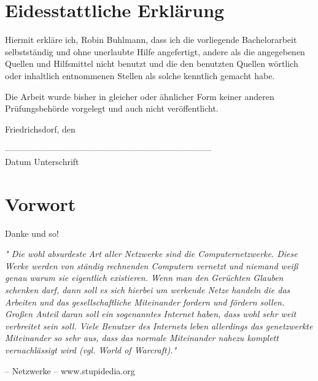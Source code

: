 \newpage
\chapter*{Eidesstattliche Erklärung}

Hiermit erkläre ich, Robin Buhlmann, dass ich die vorliegende Bachelorarbeit selbstständig und ohne unerlaubte Hilfe angefertigt, andere als die angegebenen Quellen und Hilfsmittel nicht benutzt und die den benutzten Quellen wörtlich oder inhaltlich entnommenen Stellen als solche kenntlich gemacht habe.

Die Arbeit wurde bisher in gleicher oder ähnlicher Form keiner anderen Prüfungsbehörde vorgelegt und auch nicht veröffentlicht.


\vspace{1cm}

Friedrichsdorf, den

\vspace{1cm}

------------------------------------\hspace{6cm}------------------------------------\\
Datum \hspace{9,4cm} Unterschrift

\newpage

\chapter*{Vorwort}
\setlength{\parindent}{0em}
\setlength{\parskip}{1em}

Danke und so!\par

\begin{displayquote} 
\textit{"
Die wohl absurdeste Art aller Netzwerke sind die Computernetzwerke. Diese Werke werden von ständig rechnenden Computern vernetzt und niemand weiß genau warum sie eigentlich existieren. Wenn man den Gerüchten Glauben schenken darf, dann soll es sich hierbei um werkende Netze handeln die das Arbeiten und das gesellschaftliche Miteinander fordern und fördern sollen. Großen Anteil daran soll ein sogenanntes Internet haben, dass wohl sehr weit verbreitet sein soll. Viele Benutzer des Internets leben allerdings das genetzwerkte Miteinander so sehr aus, dass das normale Miteinander nahezu komplett vernachlässigt wird (vgl. World of Warcraft)."}\par
\hfill
 -- Netzwerke -- www.stupidedia.org
\end{displayquote}

